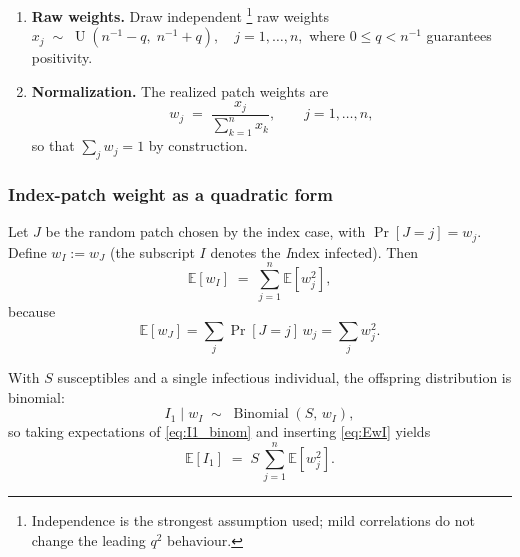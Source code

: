 \begin{enumerate}
\item \textbf{Raw weights.}  
  Draw independent%
  \footnote{Independence is the strongest assumption used;
            mild correlations do not change the leading
            $q^{2}$ behaviour.} raw weights
  $
    x_{j}\;\sim\; \operatorname{U}(n^{-1}-q,\;n^{-1}+q),
    \quad j=1,\dots,n,
  $
  where $0 \le q < n^{-1}$ guarantees positivity.

\item \textbf{Normalization.}  
  The realized patch weights are
  \begin{equation}
    w_{j}
      \;=\;
      \frac{x_{j}}
           {\displaystyle\sum_{k=1}^{n} x_{k}},
    \qquad j=1,\dots,n,
    \label{eq:w_normalise}
  \end{equation}
  so that $\sum_{j} w_{j}=1$ by construction.
\end{enumerate}

\subsubsection*{Index-patch weight as a quadratic form}

Let $J$ be the random patch chosen by the index case, with
$\Pr[J=j]=w_{j}$.  Define
$
  w_{I} := w_{J}
$
(the subscript $I$ denotes the \textit{I}ndex infected).  Then
\begin{equation}
  \mathbb{E}[w_{I}]
    \;=\;
    \sum_{j=1}^{n} \mathbb{E}[w_{j}^{2}],
    \tag{A.1}\label{eq:EwI}
\end{equation}
because 
\begin{equation}
\mathbb{E}[w_{J}]
      =\sum_{j} \Pr[J=j]\,w_{j}
      =\sum_{j} w_{j}^{2}.
\end{equation}

With $S$ susceptibles and a single infectious individual, the offspring
distribution is binomial:
\begin{equation}
  I_{1}\;\bigl|\;w_{I} \;\sim\;
    \operatorname{Binomial}(S,\,w_{I}),
  \label{eq:I1_binom}
\end{equation}
so taking expectations of \eqref{eq:I1_binom} and inserting
\eqref{eq:EwI} yields
\begin{equation}
  \mathbb{E}[I_{1}]
    \;=\; S \,\sum_{j=1}^{n} \mathbb{E}[w_{j}^{2}].
  \label{eq:EI1_sumwj2}
\end{equation}


